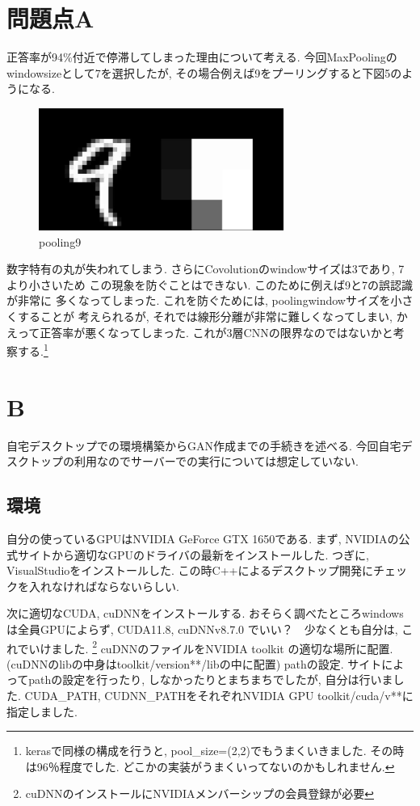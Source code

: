 \documentclass[a4paper,11pt]{jsarticle}
\begin{document}
\section{問題点A}
正答率が94\%付近で停滞してしまった理由について考える.
今回MaxPoolingのwindowsizeとして7を選択したが,
その場合例えば9をプーリングすると下図5のようになる.
\begin{figure}[h]
  \centering
  \includegraphics[height = 4cm]{pooling9.jpg}
  \caption{pooling9}
\end{figure}
数字特有の丸が失われてしまう. さらにCovolutionのwindowサイズは3であり, 7より小さいため
この現象を防ぐことはできない. このために例えば9と7の誤認識が非常に
多くなってしまった. これを防ぐためには, poolingwindowサイズを小さくすることが
考えられるが, それでは線形分離が非常に難しくなってしまい, かえって正答率が悪くなってしまった.
これが3層CNNの限界なのではないかと考察する.\footnote{
  kerasで同様の構成を行うと, pool\_size=(2,2)でもうまくいきました.
  その時は96％程度でした. どこかの実装がうまくいってないのかもしれません.
}



\section{B}
自宅デスクトップでの環境構築からGAN作成までの手続きを述べる.
今回自宅デスクトップの利用なのでサーバーでの実行については想定していない.
\subsection{環境}
自分の使っているGPUはNVIDIA GeForce GTX 1650である.
まず, NVIDIAの公式サイトから適切なGPUのドライバの最新をインストールした.
つぎに, VisualStudioをインストールした. この時C++によるデスクトップ開発にチェックを入れなければならないらしい.

次に適切なCUDA, cuDNNをインストールする. おそらく調べたところwindowsは全員GPUによらず, CUDA11.8, cuDNNv8.7.0
でいい？　少なくとも自分は, これでいけました. \footnote{cuDNNのインストールにNVIDIAメンバーシップの会員登録が必要}
cuDNNのファイルをNVIDIA toolkit の適切な場所に配置. (cuDNNのlibの中身はtoolkit/version**/libの中に配置)
pathの設定. サイトによってpathの設定を行ったり, しなかったりとまちまちでしたが, 自分は行いました.
CUDA\_PATH, CUDNN\_PATHをそれぞれNVIDIA GPU toolkit/cuda/v**に指定しました.
\end{document}
